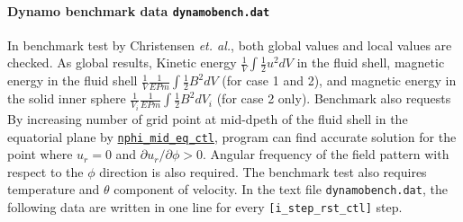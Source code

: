 \paragraph{Dynamo benchmark data {\tt dynamobench.dat}}
 In benchmark test by Christensen {\it et. al.}, both global values and local values are checked. As global results, Kinetic energy 
 $\displaystyle{ \frac{1}{V} \int \frac{1}{2} u^{2} dV}$ in the fluid shell, magnetic energy in the fluid shell 
 $\displaystyle{ \frac{1}{V} \frac{1}{E Pm} \int \frac{1}{2} B^{2} dV}$ (for case 1 and 2), and magnetic energy in the solid inner sphere 
 $\displaystyle{ \frac{1}{V_{i}} \frac{1}{E Pm} \int \frac{1}{2} B^{2} dV_{i}}$ (for case 2 only). Benchmark also requests 
 By increasing number of grid point at mid-dpeth of the fluid shell in the equatorial plane by \hyperref[href_t:nphi_mid_eq_ctl]{{\tt nphi\_mid\_eq\_ctl}}, program can find accurate solution for the point where $u_{r} = 0$ and $\partial u_{r} / \partial \phi > 0$. Angular frequency of the field pattern with respect to the $\phi$ direction is also required. The benchmark test also requires temperature and $\theta$ component of velocity. In the text file {\tt dynamobench.dat}, the following data are written in one line for every \verb|[i_step_rst_ctl]| step.
%
